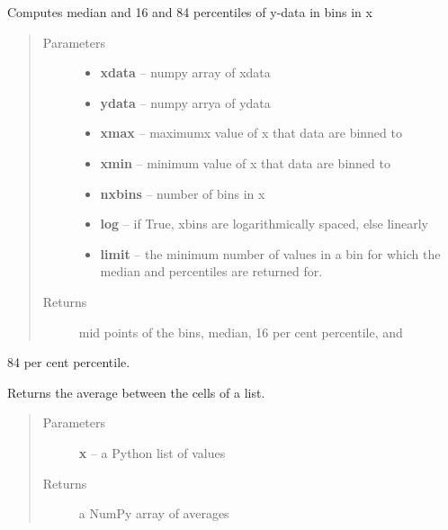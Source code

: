 \documentclass[letterpaper,10pt,english]{sphinxmanual}
\begin{document}
\begin{fulllineitems}
\label{SamPy.astronomy:SamPy.astronomy.datamanipulation.percentile_bins}
Computes median and 16 and 84 percentiles of y-data in bins in x
\begin{quote}\begin{description}
\item[{Parameters}] \leavevmode\begin{itemize}
\item {} 
\textbf{xdata} -- numpy array of xdata

\item {} 
\textbf{ydata} -- numpy arrya of ydata

\item {} 
\textbf{xmax} -- maximumx value of x that data are binned to

\item {} 
\textbf{xmin} -- minimum value of x that data are binned to

\item {} 
\textbf{nxbins} -- number of bins in x

\item {} 
\textbf{log} -- if True, xbins are logarithmically spaced, else linearly

\item {} 
\textbf{limit} -- the minimum number of values in a bin for which the
median and percentiles are returned for.

\end{itemize}

\item[{Returns}] \leavevmode
mid points of the bins, median, 16 per cent percentile, and

\end{description}\end{quote}

84 per cent percentile.

\end{fulllineitems}



\begin{fulllineitems}
\label{SamPy.astronomy:SamPy.astronomy.datamanipulation.rollingAverage}
Returns the average between the cells of a list.
\begin{quote}\begin{description}
\item[{Parameters}] \leavevmode
\textbf{x} -- a Python list of values

\item[{Returns}] \leavevmode
a NumPy array of averages

\end{description}\end{quote}

\end{fulllineitems}
\end{document}
